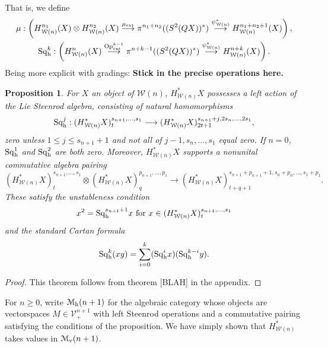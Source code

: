 \documentclass[11pt]{amsart}
\theoremstyle{plain}
\newtheorem{prop}[thm]{Proposition}
\theoremstyle{definition}
\renewcommand{\to}{\longrightarrow}
\newcommand{\calW}{\mathcal{W}}
\newcommand{\calV}{\mathcal{V}}
\newcommand{\calM}{\mathcal{M}}
\theoremstyle{plain}
\newcommand{\vect}[2]{\calV^{#1}_{#2}}
\newcommand{\ExtCohOp}{\textup{Op}_\textup{ext}}
\newcommand{\ExtCohProd}{\mu_\textup{ext}}
\newcommand{\Sq}{\mathrm{Sq}}
\begin{document}
\begin{Cohomology operations for all unstable Lie algebras}
That is, we define
\begin{gather*}
\mu:\left(H_{\calW(n)}^{n_1}(X)\otimes H_{\calW(n)}^{n_2}(X)\overset{\ExtCohProd}{\to} \pi^{n_1+n_2}((S^2(QX))^*)\overset{\psi_{\calW(n)}^*}{\to} H_{\calW(n)}^{n_1+n_2+1}(X)\right),\\
\Sq^k_\textup{h}:\left(H_{\calW(n)}^{n}(X)\overset{\ExtCohOp^{k-1}}{\to} \pi^{n+k-1}((S^2(QX))^*)\overset{\psi_{\calW(n)}^*}{\to} H_{\calW(n)}^{n+k}(X)\right).
\end{gather*}
Being more explicit with gradings:
\textbf{Stick in the precise operations here.}

\begin{prop}
For $X$ an object of $\calW(n)$, $H^*_{\calW(n)}X$ possesses a left action of the Lie Steenrod algebra, consisting of natural homomorphisms
\[\Sq^j_\textup{h}:(H^*_{\calW(n)}X)_t^{s_{n+1},\ldots,s_1}\to (H^*_{\calW(n)}X)_{2t+1}^{s_{n+1}+j,2s_{n},\ldots,2s_1},\]
zero unless $1\leq j\leq s_{n+1}+1$ and not all of $j-1,s_{n},\ldots,s_1$ equal zero. If $n=0$, $\Sq_\textup{h}^1$ and $\Sq^2_\textup{h}$ are both zero.  Moreover, $H^*_{\calW(n)}X$ supports a nonunital commutative algebra pairing
\[(H^*_{\calW(n)}X)_t^{s_{n+1},\ldots,s_1}\otimes (H^*_{\calW(n)}X)_q^{p_{n+1},\ldots,p_1}\to (H^*_{\calW(n)}X)_{t+q+1}^{s_{n+1}+p_{n+1}+1,s_{n}+p_{n},\ldots,s_1+p_1}.\]
These satisfy the unstableness condition
\[x^2=\Sq^{s_{n+1}+1}_\textup{h}x\text{ for }x\in (H^*_{\calW(n)}X)_t^{s_{n+1},\ldots,s_1}\]
and the standard Cartan formula
\[\Sq^k_\textup{h}(xy)=\sum_{i=0}^k(\Sq^i_\textup{h}x)(\Sq^{k-i}_\textup{h}y).\]
\end{prop}
\begin{proof}
This theorem follows from theorem [BLAH] in the appendix.
\end{proof}
For $n\geq0$, write $\calM_\textup{h}(n+1)$ for the algebraic category whose objects are vectorspaces $M\in\vect{n+1}{+}$ with left Steenrod operations and a commutative pairing satisfying the conditions of the proposition. We have simply shown that $H^*_{\calW(n)}$ takes values in $\calM_\textup{v}(n+1)$.


\end{Cohomology operations for all unstable Lie algebras}
\end{document}
